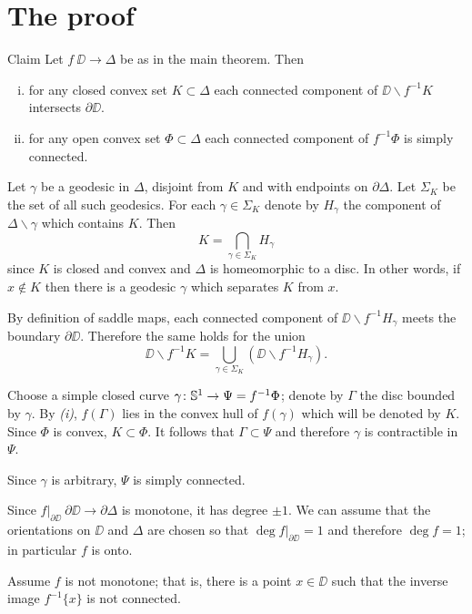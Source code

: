 \documentclass{article}
\begin{document}
\section{The proof}

\begin{thm}{Claim}\label{claim}
Let $f\:\DD\to \Delta$ be as in the main theorem.
Then 
\begin{enumerate}[(i)]
\item for any closed convex set $K\subset\Delta$ each connected component of $\DD\backslash f^{-1}K$ intersects $\partial\DD$.
\item for any open convex set $\Phi\subset\Delta$ each connected component of $f^{-1}\Phi$ is simply connected.
\end{enumerate}
\end{thm}

Let $\gamma$ be a geodesic in $\Delta$, disjoint from $K$ and with endpoints on $\partial\Delta$.
Let $\Sigma_K$ be the set of all such geodesics.
For each $\gamma\in\Sigma_K$ denote by
$H_\gamma$ the component of $\Delta\backslash\gamma$ which contains $K$.
Then
\[K=\bigcap_{\gamma\in\Sigma_K} H_\gamma\]
since $K$ is closed and convex and $\Delta$ is homeomorphic to a disc.
In other words, if $x\notin K$ then there is a geodesic $\gamma$ which separates $K$ from $x$. %

By definition of saddle maps, each connected component of $\DD\backslash f^{-1}H_\gamma$ meets the boundary $\partial \DD$.
Therefore the same holds for the union
\[\DD\backslash f^{-1}K=\bigcup_{\gamma\in\Sigma_K}(\DD\backslash f^{-1}H_\gamma).\]

Choose a simple closed curve $\gamma\colon\mathbb{S}^1\to\Psi=f^{-1}\Phi$;
denote by $\Gamma$ the disc bounded by $\gamma$.
By \textit{(i)}, $f(\Gamma)$ lies in the convex hull of $f(\gamma)$ which will be denoted by $K$.
Since $\Phi$ is convex,  $K\subset \Phi$.
It follows that $\Gamma\subset\Psi$ and therefore $\gamma$ is contractible in $\Psi$.

Since $\gamma$ is arbitrary, $\Psi$ is simply connected.
\qeds

Since $f|_{\partial\DD}\:\partial\DD \to\partial \Delta$ is monotone, it has degree $\pm1$.
We can assume that the orientations on $\DD$ and $\Delta$ are chosen so that $\deg f|_{\partial\DD}=1$
and therefore $\deg f=1$;
in particular $f$ is onto.

Assume $f$ is not monotone;
that is, there is a point $x\in \DD$ such that the inverse image $f^{-1}\{x\}$ is not connected.
\end{document}
